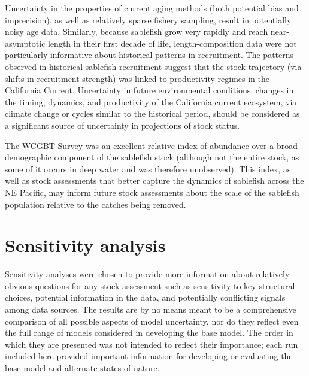 \documentclass[11pt,
  english,
  a4paper,
]{article}
\begin{document}
\leavevmode\tagmcend\tagstructend\par


Uncertainty in the properties of current aging methods (both potential bias and imprecision), as well as relatively sparse fishery sampling, result in potentially noisy age data. Similarly, because sablefish grow very rapidly and reach near-asymptotic length in their first decade of life, length-composition data were not particularly informative about historical patterns in recruitment. The patterns observed in historical sablefish recruitment suggest that the stock trajectory (via shifts in recruitment strength) was linked to productivity regimes in the California Current. Uncertainty in future environmental conditions, changes in the timing, dynamics, and productivity of the California current ecosystem, via climate change or cycles similar to the historical period, should be considered as a significant source of uncertainty in projections of stock status.

\leavevmode\tagmcend\tagstructend\par


The WCGBT Survey was an excellent relative index of abundance over a broad demographic component of the sablefish stock (although not the entire stock, as some of it occurs in deep water and was therefore unobserved). This index, as well as stock assessments that better capture the dynamics of sablefish across the NE Pacific, may inform future stock assessments about the scale of the sablefish population relative to the catches being removed.

\leavevmode\tagmcend\tagstructend\par


\hypertarget{sensitivity-analysis}{%
\section{Sensitivity analysis}\label{sensitivity-analysis}}

\leavevmode\tagmcend\tagstructend


Sensitivity analyses were chosen to provide more information about relatively obvious questions for any stock assessment such as sensitivity to key structural choices, potential information in the data, and potentially conflicting signals among data sources. The results are by no means meant to be a comprehensive comparison of all possible aspects of model uncertainty, nor do they reflect even the full range of models considered in developing the base model. The order in which they are presented was not intended to reflect their importance; each run included here provided important information for developing or evaluating the base model and alternate states of nature.
\end{document}
